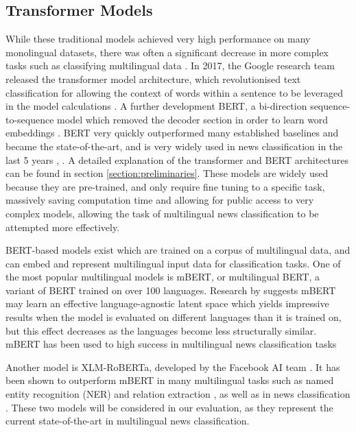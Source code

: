\documentclass{l4proj}
\begin{document}
\subsection{Transformer Models}
While these traditional models achieved very high performance on many monolingual datasets, there was often a significant decrease in more complex tasks such as classifying multilingual data \citep{vogel2020detecting}. In 2017, the Google research team released the transformer model architecture, which revolutionised text classification for allowing the context of words within a sentence to be leveraged in the model calculations \citep{vaswani2017attention}. A further development BERT, a bi-direction sequence-to-sequence model which removed the decoder section in order to learn word embeddings \citep{devlin2018bert}. BERT very quickly outperformed many established baselines and became the state-of-the-art, and is very widely used in news classification in the last 5 years \citep{chen2022long, mujahid2021classification, deping2021news}, . A detailed explanation of the transformer and BERT architectures can be found in section \ref{section:preliminaries}. These models are widely used because they are pre-trained, and only require fine tuning to a specific task, massively saving computation time and allowing for public access to very complex models, allowing the task of multilingual news classification to be attempted more effectively.

BERT-based models exist which are trained on a corpus of multilingual data, and can embed and represent multilingual input data for classification tasks. One of the most popular multilingual models is mBERT, or multilingual BERT, a variant of BERT trained on over 100 languages. Research by \cite{pires2019multilingual} suggests mBERT may learn an effective language-agnostic latent space which yields impressive results when the model is evaluated on different languages than it is trained on, but this effect decreases as the languages become less structurally similar. mBERT has been used to high success in multilingual news classification tasks \citep{kakwani2020indicnlpsuite, hutama2022indonesian} \par
Another model is XLM-RoBERTa, developed by the Facebook AI team \citep{conneau2019unsupervised}. It has been shown to outperform mBERT in many multilingual tasks such as named entity recognition (NER) and relation extraction \citep{li2021cross, lan2020empirical}, as well as in news classification \citep{alam2020bangla}. These two models will be considered in our evaluation, as they represent the current state-of-the-art in multilingual news classification.
\end{document}
